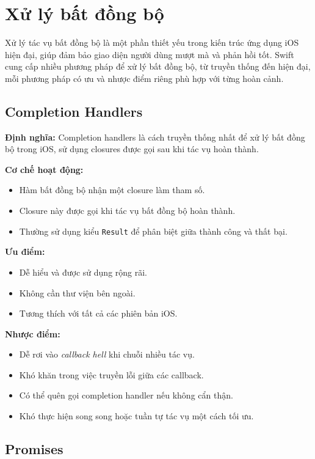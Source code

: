 \section{Xử lý bất đồng bộ}

Xử lý tác vụ bất đồng bộ là một phần thiết yếu trong kiến trúc ứng dụng iOS hiện đại, giúp đảm bảo giao diện người dùng mượt mà và phản hồi tốt. Swift cung cấp nhiều phương pháp để xử lý bất đồng bộ, từ truyền thống đến hiện đại, mỗi phương pháp có ưu và nhược điểm riêng phù hợp với từng hoàn cảnh.

\subsection{Completion Handlers}

\textbf{Định nghĩa:} Completion handlers là cách truyền thống nhất để xử lý bất đồng bộ trong iOS, sử dụng closures được gọi sau khi tác vụ hoàn thành.

\textbf{Cơ chế hoạt động:}
\begin{itemize}
    \item Hàm bất đồng bộ nhận một closure làm tham số.
    \item Closure này được gọi khi tác vụ bất đồng bộ hoàn thành.
    \item Thường sử dụng kiểu \texttt{Result} để phân biệt giữa thành công và thất bại.
\end{itemize}

\textbf{Ưu điểm:}
\begin{itemize}
    \item Dễ hiểu và được sử dụng rộng rãi.
    \item Không cần thư viện bên ngoài.
    \item Tương thích với tất cả các phiên bản iOS.
\end{itemize}

\textbf{Nhược điểm:}
\begin{itemize}
    \item Dễ rơi vào \textit{callback hell} khi chuỗi nhiều tác vụ.
    \item Khó khăn trong việc truyền lỗi giữa các callback.
    \item Có thể quên gọi completion handler nếu không cẩn thận.
    \item Khó thực hiện song song hoặc tuần tự tác vụ một cách tối ưu.
\end{itemize}

\subsection{Promises}

